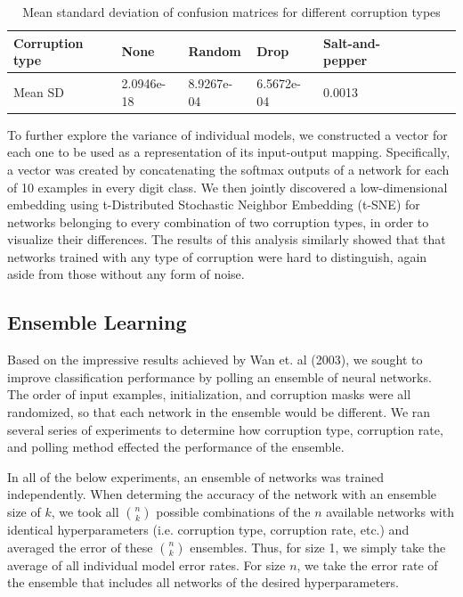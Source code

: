 \documentclass{article} %
\begin{document}
\begin{table}[ht]
\label{tab:sd_confusionMats}
\caption{Mean standard deviation of confusion matrices for different corruption types}
\begin{center}
\begin{tabular}{| l |  l |  l  | l | l | l | l | l |}
\hline
Corruption type & None & Random & Drop & Salt-and-pepper \\
\hline
Mean SD & 2.0946e-18 & 8.9267e-04 & 6.5672e-04 & 0.0013 \\
\hline
\end{tabular}
\end{center}
\end{table}

To further explore the variance of individual models, we constructed a vector for each one to be used as a representation of its input-output mapping. Specifically, a vector was created by concatenating the softmax outputs of a network for each of 10 examples in every digit class. We then jointly discovered a low-dimensional embedding using t-Distributed Stochastic Neighbor Embedding (t-SNE) for networks belonging to every combination of two corruption types, in order to visualize their differences. The results of this analysis similarly showed that that networks trained with any type of corruption were hard to distinguish, again aside from those without any form of noise.

\subsection{Ensemble Learning}
Based on the impressive results achieved by Wan et. al (2003), we sought to improve classification performance by polling an ensemble of neural networks. The order of input examples, initialization, and corruption masks were all randomized, so that each network in the ensemble would be different. We ran several series of experiments to determine how corruption type, corruption rate, and polling method effected the performance of the ensemble.

In all of the below experiments, an ensemble of networks was trained independently. When determing the accuracy of the network with an ensemble size of $k$, we took all $n \choose k$ possible combinations of the $n$ available networks with identical hyperparameters (i.e. corruption type, corruption rate, etc.) and averaged the error of these $n \choose k$ ensembles. Thus, for size 1, we simply take the average of all individual model error rates. For size $n$, we take the error rate of the ensemble that includes all networks of the desired hyperparameters.
\end{document}
